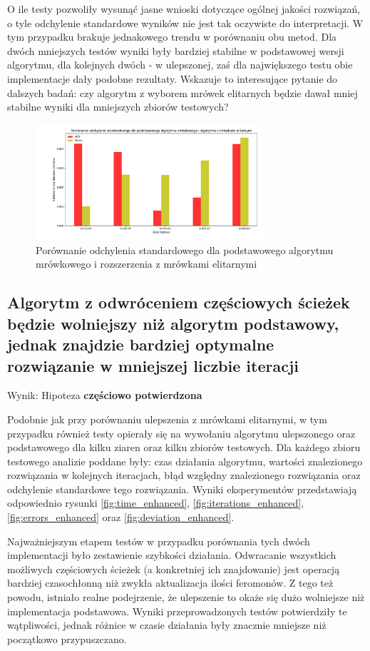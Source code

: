 \documentclass[10pt]{article}
\begin{document}
O ile testy pozwoliły wysunąć jasne wnioski dotyczące ogólnej jakości rozwiązań, o tyle odchylenie standardowe wyników nie jest tak oczywiste do interpretacji. W tym przypadku brakuje jednakowego trendu w porównaniu obu metod. Dla dwóch mniejszych testów wyniki były bardziej stabilne w podstawowej wersji algorytmu, dla kolejnych dwóch - w ulepszonej, zaś dla największego testu obie implementacje dały podobne rezultaty. Wskazuje to interesujące pytanie do dalszych badań: czy algorytm z wyborem mrówek elitarnych będzie dawał mniej stabilne wyniki dla mniejszych zbiorów testowych?

\begin{figure}[H]
    \centering
    \includegraphics[width=0.75\textwidth]{deviation_elitist.png}
    \caption{Porównanie odchylenia standardowego dla podstawowego algorytmu mrówkowego i rozszerzenia z mrówkami elitarnymi}
    \label{fig:deviation_elitist}
\end{figure}

\subsection{Algorytm z odwróceniem częściowych ścieżek będzie wolniejszy niż algorytm podstawowy, jednak znajdzie bardziej optymalne rozwiązanie w mniejszej liczbie iteracji}
Wynik: Hipoteza \textbf{częściowo potwierdzona}

Podobnie jak przy porównaniu ulepszenia z mrówkami elitarnymi, w tym przypadku również testy opierały się na wywołaniu algorytmu ulepszonego oraz podstawowego dla kilku ziaren oraz kilku zbiorów testowych. Dla każdego zbioru testowego analizie poddane były: czas działania algorytmu, wartości znalezionego rozwiązania w kolejnych iteracjach, błąd względny znalezionego rozwiązania oraz odchylenie standardowe tego rozwiązania. Wyniki eksperymentów przedstawiają odpowiednio rysunki \ref{fig:time_enhanced}, \ref{fig:iterations_enhanced}, \ref{fig:errors_enhanced} oraz \ref{fig:deviation_enhanced}.

Najważniejszym etapem testów w przypadku porównania tych dwóch implementacji było zestawienie szybkości działania. Odwracanie wszystkich możliwych częściowych ścieżek (a konkretniej ich znajdowanie) jest operacją bardziej czasochłonną niż zwykła aktualizacja ilości feromonów. Z tego też powodu, istniało realne podejrzenie, że ulepszenie to okaże się dużo wolniejsze niż implementacja podstawowa. Wyniki przeprowadzonych testów potwierdziły te wątpliwości, jednak różnice w czasie działania były znacznie mniejsze niż początkowo przypuszczano.
\end{document}

